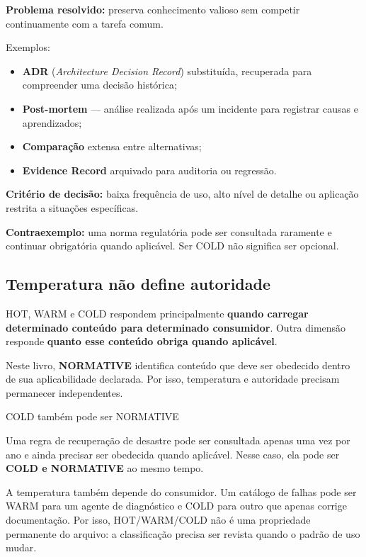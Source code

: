 \documentclass[
  10pt,
  a4paper,
  oneside]{book}
\providecommand{\tightlist}{%
  \setlength{\itemsep}{0pt}\setlength{\parskip}{0pt}}
\begin{document}
\textbf{Problema resolvido:} preserva conhecimento valioso sem competir
continuamente com a tarefa comum.

Exemplos:

\begin{itemize}
\tightlist
\item
  \textbf{ADR} (\emph{Architecture Decision Record}) substituída,
  recuperada para compreender uma decisão histórica;
\item
  \textbf{Post-mortem} --- análise realizada após um incidente para
  registrar causas e aprendizados;
\item
  \textbf{Comparação} extensa entre alternativas;
\item
  \textbf{Evidence Record} arquivado para auditoria ou regressão.
\end{itemize}

\textbf{Critério de decisão:} baixa frequência de uso, alto nível de
detalhe ou aplicação restrita a situações específicas.

\textbf{Contraexemplo:} uma norma regulatória pode ser consultada
raramente e continuar obrigatória quando aplicável. Ser COLD não
significa ser opcional.

\hypertarget{temperatura-nuxe3o-define-autoridade}{%
\subsection{Temperatura não define
autoridade}\label{temperatura-nuxe3o-define-autoridade}}

HOT, WARM e COLD respondem principalmente \textbf{quando carregar
determinado conteúdo para determinado consumidor}. Outra dimensão
responde \textbf{quanto esse conteúdo obriga quando aplicável}.

Neste livro, \textbf{NORMATIVE} identifica conteúdo que deve ser
obedecido dentro de sua aplicabilidade declarada. Por isso, temperatura
e autoridade precisam permanecer independentes.

\begin{infobox}{COLD também pode ser NORMATIVE}

Uma regra de recuperação de desastre pode ser consultada apenas uma vez
por ano e ainda precisar ser obedecida quando aplicável. Nesse caso, ela
pode ser \textbf{COLD e NORMATIVE} ao mesmo tempo.

\end{infobox}

A temperatura também depende do consumidor. Um catálogo de falhas pode
ser WARM para um agente de diagnóstico e COLD para outro que apenas
corrige documentação. Por isso, HOT/WARM/COLD não é uma propriedade
permanente do arquivo: a classificação precisa ser revista quando o
padrão de uso mudar.
\end{document}
